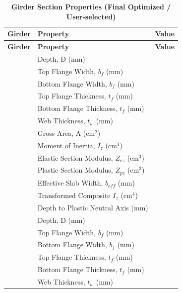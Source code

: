 \documentclass[12pt,a4paper]{report}
\numberwithin{table}{chapter}
\numberwithin{figure}{chapter}
\begin{document}
\begin{longtable}{|C{2.5cm}|L{8.0cm}|>{\centering\arraybackslash}p{5.0cm}|}
\caption{\textbf{Girder Section Properties (Final Optimized / User-selected)}}
\hline
{} \textbf{Girder} & \textbf{Property} & \textbf{Value} \\[6pt]
\hline
\endfirsthead
\hline
{} \textbf{Girder} & \textbf{Property} & \textbf{Value} \\[6pt]
\hline
\endhead
{} & \textnormal{Depth, D (mm)} &  \\[6pt]
 & \textnormal{Top Flange Width, $b_f$ (mm)} &  \\[6pt]
 & \textnormal{Bottom Flange Width, $b_f$ (mm)} &  \\[6pt]
 & \textnormal{Top Flange Thickness, $t_f$ (mm)} &  \\[6pt]
 & \textnormal{Bottom Flange Thickness, $t_f$ (mm)} &  \\[6pt]
 & \textnormal{Web Thickness, $t_w$ (mm)} &  \\[6pt]
 & \textnormal{Gross Area, A (cm$^2$)} &  \\[6pt]
 & \textnormal{Moment of Inertia, $I_z$ (cm$^4$)} &  \\[6pt]
 & \textnormal{Elastic Section Modulus, $Z_{ez}$ (cm$^3$)} &  \\[6pt]
 & \textnormal{Plastic Section Modulus, $Z_{pz}$ (cm$^3$)} &  \\[6pt]
 & \textnormal{Effective Slab Width, $b_{eff}$ (mm)} &  \\[6pt]
 & \textnormal{Transformed Composite $I_z$ (cm$^4$)} &  \\[6pt]
 & \textnormal{Depth to Plastic Neutral Axis (mm)} &  \\[6pt]
\hline
{} & \textnormal{Depth, D (mm)} &  \\[6pt]
 & \textnormal{Top Flange Width, $b_f$ (mm)} &  \\[6pt]
 & \textnormal{Bottom Flange Width, $b_f$ (mm)} &  \\[6pt]
 & \textnormal{Top Flange Thickness, $t_f$ (mm)} &  \\[6pt]
 & \textnormal{Bottom Flange Thickness, $t_f$ (mm)} &  \\[6pt]
 & \textnormal{Web Thickness, $t_w$ (mm)} &  \\[6pt]

\end{longtable}
\end{document}
